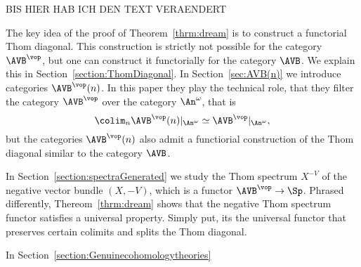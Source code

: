 \medskip

BIS HIER HAB ICH DEN TEXT VERAENDERT

The key idea of the proof of Theorem~\ref{thrm:dream} is to construct a functorial Thom diagonal.
This construction is strictly not possible for the category $\AVB^\vop$, but one can construct it
functorially for the category $\AVB$. We explain this in Section~\ref{section:ThomDiagonal}.
In Section~\ref{sec:AVB(n)} we introduce categories $\AVB^\vop(n)$.
In this paper they play the technical role, that they filter the category $\AVB^\vop$ over the category $\An^\omega$, that is 
\[
\colim_n \AVB^\vop(n)|_{\An^\omega} \simeq \AVB^\vop|_{\An^\omega},    
\]
but the categories $\AVB^\vop(n)$ also admit a functiorial construction of the Thom diagonal similar to the category $\AVB$.

In Section~\ref{section:spectraGenerated} we study the Thom spectrum $X^{-V}$ of the negative vector bundle $(X,-V)$, which 
is a functor $\AVB^\vop \to \Sp$. Phrased differently, Thereom~\ref{thrm:dream} shows that the 
negative Thom spectrum functor satisfies a universal property. 
Simply put, its the universal functor that preserves certain colimits and splits the 
Thom diagonal.

In Section~\ref{section:Genuinecohomologytheories}




